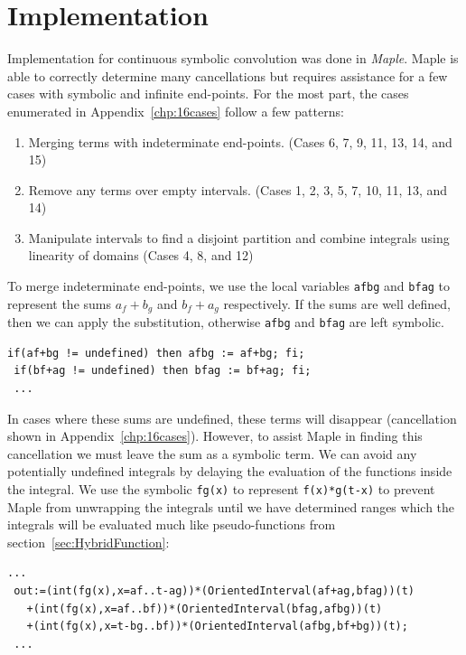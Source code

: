 %
%
\section{Implementation}

Implementation for continuous symbolic convolution was done in \emph{Maple}.
Maple is able to correctly determine many cancellations but requires assistance for a few cases with symbolic and infinite
end-points.
For the most part, the cases enumerated in Appendix~\ref{chp:16cases} follow a few patterns:
\begin{enumerate}
	\item Merging terms with indeterminate end-points. (Cases 6, 7, 9, 11, 13, 14, and 15)
	\item Remove any terms over empty intervals. (Cases 1, 2, 3, 5, 7, 10, 11, 13, and 14)
	\item Manipulate intervals to find a disjoint partition and combine integrals using linearity of domains 
	(Cases 4, 8, and 12)
\end{enumerate}


To merge indeterminate end-points, we use the local variables \texttt{afbg} and \texttt{bfag} to represent the sums
$a_f+b_g$ and $b_f+a_g$ respectively.
If the sums are well defined, then we can apply the substitution, otherwise \texttt{afbg} and \texttt{bfag} are left symbolic.


\begin{lstlisting}[frame=single]
 if(af+bg != undefined) then afbg := af+bg; fi;
 if(bf+ag != undefined) then bfag := bf+ag; fi;
 ...
\end{lstlisting}


In cases where these sums are undefined, these terms will disappear (cancellation shown in Appendix~\ref{chp:16cases}).
However, to assist Maple in finding this cancellation we must leave the sum as a symbolic term.
We can avoid any potentially undefined integrals by delaying the evaluation of the functions inside the integral.
We use the symbolic \texttt{fg(x)} to represent \texttt{f(x)*g(t-x)} to prevent Maple from unwrapping the integrals
until we have determined ranges which the integrals will be evaluated much like pseudo-functions from
 section~\ref{sec:HybridFunction}:


\begin{lstlisting}[frame=single]
 ...
 out:=(int(fg(x),x=af..t-ag))*(OrientedInterval(af+ag,bfag))(t)
   +(int(fg(x),x=af..bf))*(OrientedInterval(bfag,afbg))(t)
   +(int(fg(x),x=t-bg..bf))*(OrientedInterval(afbg,bf+bg))(t);
 ...
\end{lstlisting}


